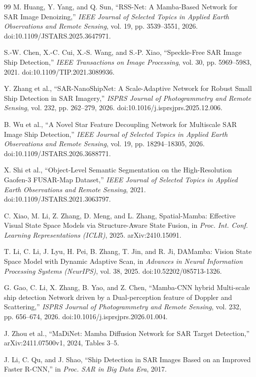 \documentclass[journal]{IEEEtran}
\begin{document}
\begin{thebibliography}{99}
M. Huang, Y. Yang, and Q. Sun, ``RSS-Net: A Mamba-Based Network for SAR Image Denoizing,'' \emph{IEEE Journal of Selected Topics in Applied Earth Observations and Remote Sensing}, vol. 19, pp. 3539--3551, 2026. doi:10.1109/JSTARS.2025.3647971.

S.-W. Chen, X.-C. Cui, X.-S. Wang, and S.-P. Xiao, ``Speckle-Free SAR Image Ship Detection,'' \emph{IEEE Transactions on Image Processing}, vol. 30, pp. 5969--5983, 2021. doi:10.1109/TIP.2021.3089936.

Y. Zhang et al., ``SAR-NanoShipNet: A Scale-Adaptive Network for Robust Small Ship Detection in SAR Imagery,'' \emph{ISPRS Journal of Photogrammetry and Remote Sensing}, vol. 232, pp. 262--279, 2026. doi:10.1016/j.isprsjprs.2025.12.006.

B. Wu et al., ``A Novel Star Feature Decoupling Network for Multiscale SAR Image Ship Detection,'' \emph{IEEE Journal of Selected Topics in Applied Earth Observations and Remote Sensing}, vol. 19, pp. 18294--18305, 2026. doi:10.1109/JSTARS.2026.3688771.

X. Shi et al., ``Object-Level Semantic Segmentation on the High-Resolution Gaofen-3 FUSAR-Map Dataset,'' \emph{IEEE Journal of Selected Topics in Applied Earth Observations and Remote Sensing}, 2021. doi:10.1109/JSTARS.2021.3063797.

C. Xiao, M. Li, Z. Zhang, D. Meng, and L. Zhang, Spatial-Mamba: Effective Visual State Space Models via Structure-Aware State Fusion, in \emph{Proc. Int. Conf. Learning Representations (ICLR)}, 2025. arXiv:2410.15091.

T. Li, C. Li, J. Lyu, H. Pei, B. Zhang, T. Jin, and R. Ji, DAMamba: Vision State Space Model with Dynamic Adaptive Scan, in \emph{Advances in Neural Information Processing Systems (NeurIPS)}, vol. 38, 2025. doi:10.52202/085713-1326.

G. Gao, C. Li, X. Zhang, B. Yao, and Z. Chen, ``Mamba-CNN hybrid Multi-scale ship detection Network driven by a Dual-perception feature of Doppler and Scattering,'' \emph{ISPRS Journal of Photogrammetry and Remote Sensing}, vol. 232, pp. 656--674, 2026. doi:10.1016/j.isprsjprs.2026.01.004.

J. Zhou et al., ``MaDiNet: Mamba Diffusion Network for SAR Target Detection,'' arXiv:2411.07500v1, 2024, Tables 3--5.

J. Li, C. Qu, and J. Shao, ``Ship Detection in SAR Images Based on an Improved Faster R-CNN,'' in \emph{Proc. SAR in Big Data Era}, 2017.


\end{thebibliography}
\end{document}
